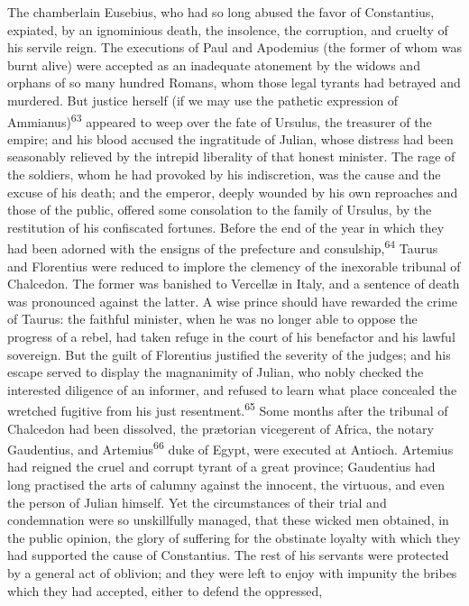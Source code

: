 The chamberlain Eusebius, who had so long abused the favor of
Constantius, expiated, by an ignominious death, the insolence,
the corruption, and cruelty of his servile reign. The executions
of Paul and Apodemius (the former of whom was burnt alive) were
accepted as an inadequate atonement by the widows and orphans of
so many hundred Romans, whom those legal tyrants had betrayed and
murdered. But justice herself (if we may use the pathetic
expression of Ammianus)\textsuperscript{63} appeared to weep over the fate of
Ursulus, the treasurer of the empire; and his blood accused the
ingratitude of Julian, whose distress had been seasonably
relieved by the intrepid liberality of that honest minister. The
rage of the soldiers, whom he had provoked by his indiscretion,
was the cause and the excuse of his death; and the emperor,
deeply wounded by his own reproaches and those of the public,
offered some consolation to the family of Ursulus, by the
restitution of his confiscated fortunes. Before the end of the
year in which they had been adorned with the ensigns of the
prefecture and consulship,\textsuperscript{64} Taurus and Florentius were reduced
to implore the clemency of the inexorable tribunal of Chalcedon.
The former was banished to Vercellæ in Italy, and a sentence of
death was pronounced against the latter. A wise prince should
have rewarded the crime of Taurus: the faithful minister, when he
was no longer able to oppose the progress of a rebel, had taken
refuge in the court of his benefactor and his lawful sovereign.
But the guilt of Florentius justified the severity of the judges;
and his escape served to display the magnanimity of Julian, who
nobly checked the interested diligence of an informer, and
refused to learn what place concealed the wretched fugitive from
his just resentment.\textsuperscript{65} Some months after the tribunal of
Chalcedon had been dissolved, the prætorian vicegerent of Africa,
the notary Gaudentius, and Artemius\textsuperscript{66} duke of Egypt, were
executed at Antioch. Artemius had reigned the cruel and corrupt
tyrant of a great province; Gaudentius had long practised the
arts of calumny against the innocent, the virtuous, and even the
person of Julian himself. Yet the circumstances of their trial
and condemnation were so unskillfully managed, that these wicked
men obtained, in the public opinion, the glory of suffering for
the obstinate loyalty with which they had supported the cause of
Constantius. The rest of his servants were protected by a general
act of oblivion; and they were left to enjoy with impunity the
bribes which they had accepted, either to defend the oppressed,

